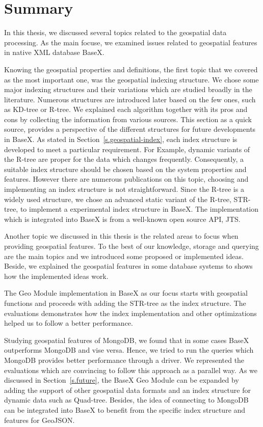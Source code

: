 \documentclass[a4paper,12pt]{article}
\begin{document}
\newpage
\section{Summary}
\label{sum}
In this thesis, we discussed several topics related to the geospatial data processing. As the main focuse, we examined issues related to geospatial features in native XML database BaseX. 

Knowing the geospatial properties and definitions, the first topic that we covered as the most important one, was the geospatial indexing structure. We chose some major indexing structures and their variations which are studied broadly in the literature. Numerous structures are introduced later based on the few ones, such as KD-tree or R-tree. We explained each algorithm together with its pros and cons by collecting the information from various sources. This section as a quick source, provides a perspective of the different structures for future developments in BaseX. As stated in Section~\ref{s.geospatial-index}, each index structure is developed to meet a particular requirement. For Example, dynamic variants of the R-tree are proper for the data which changes frequently. Consequently, a suitable index structure should be chosen based on the system properties and features. However there are numerous publications on this topic, choosing and implementing an index structure is not straightforward. Since the R-tree is a widely used structure, we chose an advanced static variant of the R-tree, STR-tree, to implement a experimental index structure in BaseX. The implementation which is integrated into BaseX is from a well-known open source API, JTS. 

Another topic we discussed in this thesis is the related areas to focus when providing geospatial features.
To the best of our knowledge, storage and querying are the main topics and we introduced some proposed or implemented ideas. Beside, we explained the geospatial features in some database systems to shows how the implemented ideas work.


The Geo Module implementation in BaseX as our focus starts with geospatial functions and proceeds with adding the STR-tree as the index structure. The evaluations demonstrates how the index implementation and other optimizations helped us to follow a better performance.


Studying geospatial features of MongoDB, we found that in some cases BaseX outperforms MongoDB and vise versa. Hence, we tried to run the queries which MongoDB provides better performance through a driver. We represented the evaluations which are convincing to follow this approach as a parallel way. 
As we discussed in Section~\ref{s.future}, the BaseX Geo Module can be expanded by adding the support of other geospatial data formats and an index structure for dynamic data such as Quad-tree. Besides, the idea of connecting to MongoDB can be integrated into BaseX to benefit from the specific index structure and features for GeoJSON.



\newpage


\newpage
\listoffigures
\newpage
\listoftables
\newpage
\lstlistoflistings
\end{document}
